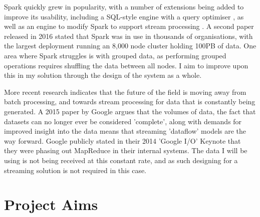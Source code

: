 Spark quickly grew in popularity, with a number of extensions being added to improve its usability, including a SQL-style engine with a query optimiser \cite{armbrust2015sparksql}, as well as an engine to modify Spark to support stream processing \cite{armbrust2018sparkstreaming}. A second paper released in 2016 \cite{zaharia2016spark} stated that Spark was in use in thousands of organisations, with the largest deployment running an 8,000 node cluster holding 100PB of data. 
One area where Spark struggles is with grouped data, as performing grouped operations requires shuffling the data between all nodes. I aim to improve upon this in my solution through the design of the system as a whole.

More recent research indicates that the future of the field is moving away from batch processing, and towards stream processing for data that is constantly being generated. A 2015 paper by Google \cite{akidau2015dataflow} argues that the volumes of data, the fact that datasets can no longer ever be considered 'complete', along with demands for improved insight into the data means that streaming 'dataflow' models are the way forward. Google publicly stated in their 2014 'Google I/O' Keynote \cite{googleio2014} that they were phasing out MapReduce in their internal systems. The data I will be using is not being received at this constant rate, and as such designing for a streaming solution is not required in this case.

\section{Project Aims}

